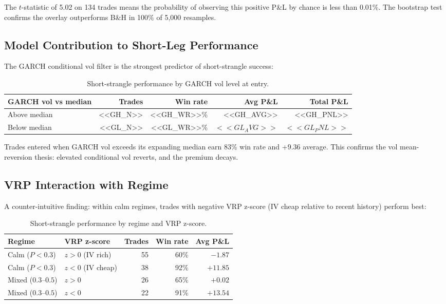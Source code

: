 \documentclass[11pt,a4paper]{article}
\begin{document}
The $t$-statistic of 5.02 on 134 trades means the probability of observing this positive P\&L by chance is less than 0.01\%. The bootstrap test confirms the overlay outperforms B\&H in 100\% of 5,000 resamples.

\subsection{Model Contribution to Short-Leg Performance}

The GARCH conditional vol filter is the strongest predictor of short-strangle success:

\begin{table}[H]
\centering
\caption{Short-strangle performance by GARCH vol level at entry.}
\label{tab:garch_contrib}
\begin{tabular}{lrrrr}
\toprule
GARCH vol vs median & Trades & Win rate & Avg P\&L & Total P\&L \\
\midrule
Above median & <<GH_N>> & <<GH_WR>>\% & <<GH_AVG>> & <<GH_PNL>> \\
Below median & <<GL_N>> & <<GL_WR>>\% & $<<GL_AVG>>$ & $<<GL_PNL>>$ \\
\bottomrule
\end{tabular}
\end{table}

Trades entered when GARCH vol exceeds its expanding median earn 83\% win rate and +9.36 average. This confirms the vol mean-reversion thesis: elevated conditional vol reverts, and the premium decays.

\subsection{VRP Interaction with Regime}

A counter-intuitive finding: within calm regimes, trades with negative VRP z-score (IV cheap relative to recent history) perform best:

\begin{table}[H]
\centering
\caption{Short-strangle performance by regime and VRP z-score.}
\begin{tabular}{llrrr}
\toprule
Regime & VRP z-score & Trades & Win rate & Avg P\&L \\
\midrule
Calm ($P < 0.3$) & $z > 0$ (IV rich) & 55 & 60\% & $-1.87$ \\
Calm ($P < 0.3$) & $z < 0$ (IV cheap) & 38 & 92\% & $+11.85$ \\
Mixed ($0.3$--$0.5$) & $z > 0$ & 26 & 65\% & $+0.02$ \\
Mixed ($0.3$--$0.5$) & $z < 0$ & 22 & 91\% & $+13.54$ \\
\bottomrule
\end{tabular}
\end{table}
\end{document}
